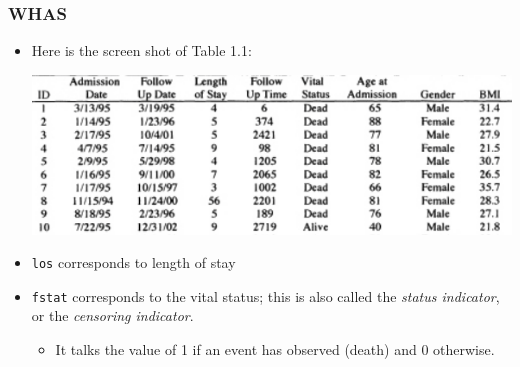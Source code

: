 \documentclass[10pt]{beamer}\usepackage[]{graphicx}\usepackage[]{color}
\newcommand{\empr}[1]{{\emph{\color{red}#1}}}
\begin{document}
\begin{frame}[fragile]
\frametitle{WHAS}
  \begin{itemize}
  \item Here is the screen shot of Table 1.1:
    \begin{center}
      \includegraphics[trim = 0 0 0 .1cm, clip, scale = .45]{tab1-1}
    \end{center}
  \item \texttt{los} corresponds to length of stay
  \item \texttt{fstat} corresponds to the vital status; this is also called the \empr{status indicator}, 
    or the \empr{censoring indicator}.
    \begin{itemize}
    \item It talks the value of 1 if an event has observed (death) and 0 otherwise.
    \end{itemize}
  \end{itemize}
\end{frame}
\end{document}
